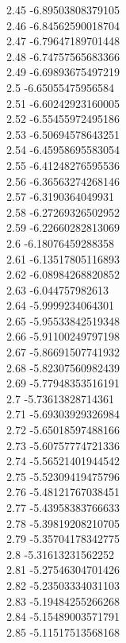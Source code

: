 {2.45	-6.89503808379105\\
2.46	-6.84562590018704\\
2.47	-6.79647189701448\\
2.48	-6.74757565683366\\
2.49	-6.69893675497219\\
2.5	-6.65055475956584\\
2.51	-6.60242923160005\\
2.52	-6.55455972495186\\
2.53	-6.50694578643251\\
2.54	-6.45958695583054\\
2.55	-6.41248276595536\\
2.56	-6.36563274268146\\
2.57	-6.3190364049931\\
2.58	-6.27269326502952\\
2.59	-6.22660282813069\\
2.6	-6.18076459288358\\
2.61	-6.13517805116893\\
2.62	-6.08984268820852\\
2.63	-6.044757982613\\
2.64	-5.9999234064301\\
2.65	-5.95533842519348\\
2.66	-5.91100249797198\\
2.67	-5.86691507741932\\
2.68	-5.82307560982439\\
2.69	-5.77948353516191\\
2.7	-5.73613828714361\\
2.71	-5.69303929326984\\
2.72	-5.65018597488166\\
2.73	-5.60757774721336\\
2.74	-5.56521401944542\\
2.75	-5.52309419475796\\
2.76	-5.48121767038451\\
2.77	-5.43958383766633\\
2.78	-5.39819208210705\\
2.79	-5.35704178342775\\
2.8	-5.31613231562252\\
2.81	-5.27546304701426\\
2.82	-5.23503334031103\\
2.83	-5.19484255266268\\
2.84	-5.15489003571791\\
2.85	-5.11517513568168\\
}
